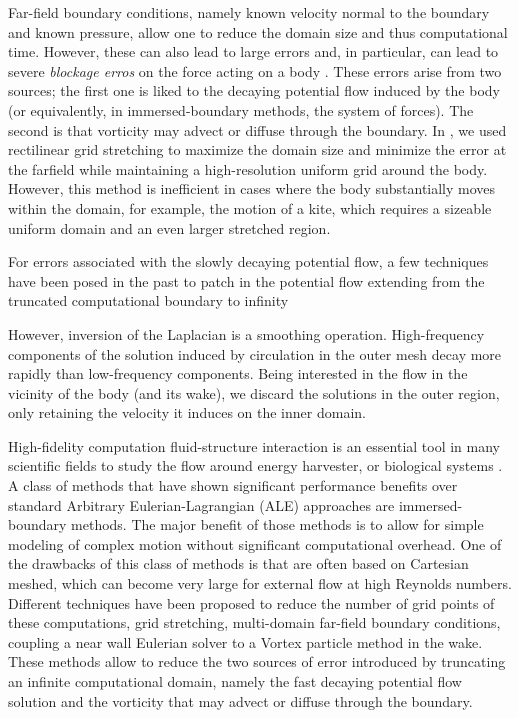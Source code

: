 \documentclass{article}
\begin{document}
Far-field boundary conditions, namely known velocity normal to the boundary and known pressure, allow one to reduce the domain size and thus computational time. However, these can also lead to large errors and, in particular, can lead to severe \emph{blockage erros} on the force acting on a body \cite{Colonius2008}. These errors arise from two sources; the first one is liked to the decaying potential flow induced by the body (or equivalently, in immersed-boundary methods, the system of forces). The second is that vorticity may advect or diffuse through the boundary. In \cite{Maertens2015, Lauber2022}, we used rectilinear grid stretching to maximize the domain size and minimize the error at the farfield while maintaining a high-resolution uniform grid around the body. However, this method is inefficient in cases where the body substantially moves within the domain, for example, the motion of a kite, which requires a sizeable uniform domain and an even larger stretched region. 


For errors associated with the slowly decaying potential flow, a few techniques have been posed in the past to patch in the potential flow extending from the truncated computational boundary to infinity \cite{Colonius2008}

However, inversion of the Laplacian is a smoothing operation. High-frequency components of the solution induced by circulation in the outer mesh decay more rapidly than low-frequency components. Being interested in the flow in the vicinity of the body (and its wake), we discard the solutions in the outer region, only retaining the velocity it induces on the inner domain.

High-fidelity computation fluid-structure interaction is an essential tool in many scientific fields to study the flow around energy harvester, or biological systems \cite{Lauber2023RapidFlight}. A class of methods that have shown significant performance benefits over standard Arbitrary Eulerian-Lagrangian (ALE) approaches are immersed-boundary methods. The major benefit of those methods is to allow for simple modeling of complex motion without significant computational overhead. One of the drawbacks of this class of methods is that are often based on Cartesian meshed, which can become very large for external flow at high Reynolds numbers. Different techniques have been proposed to reduce the number of grid points of these computations, grid stretching, multi-domain far-field boundary conditions\cite{Colonius2008}, coupling a near wall Eulerian solver to a Vortex particle method in the wake\cite{Billuart2023AFlows}. These methods allow to reduce the two sources of error introduced by truncating an infinite computational domain, namely the fast decaying potential flow solution and the vorticity that may advect or diffuse through the boundary\cite{Colonius2008}.
\end{document}
